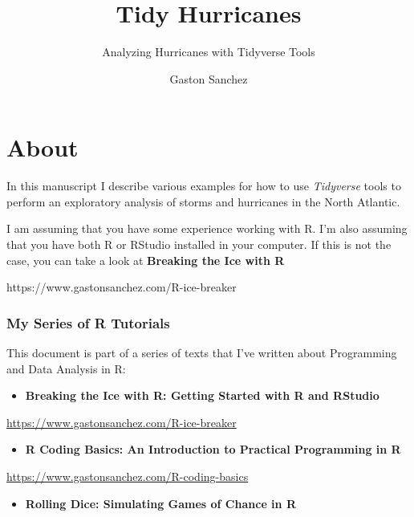 \documentclass[
]{book}
\title{Tidy Hurricanes}
\subtitle{Analyzing Hurricanes with Tidyverse Tools}
\author{Gaston Sanchez}
\date{}
\providecommand{\tightlist}{%
  \setlength{\itemsep}{0pt}\setlength{\parskip}{0pt}}
\begin{document}
\maketitle

{
\setcounter{tocdepth}{1}
\tableofcontents
}
\hypertarget{about}{%
\chapter*{About}\label{about}}

In this manuscript I describe various examples for how to use \emph{Tidyverse} tools
to perform an exploratory analysis of storms and hurricanes in the North Atlantic.

I am assuming that you have some experience working with R. I'm also assuming
that you have both R or RStudio installed in your computer. If this is not
the case, you can take a look at \textbf{Breaking the Ice with R}

https://www.gastonsanchez.com/R-ice-breaker

\hypertarget{my-series-of-r-tutorials}{%
\subsection*{My Series of R Tutorials}\label{my-series-of-r-tutorials}}

This document is part of a series of texts that I've written about Programming
and Data Analysis in R:

\begin{itemize}
\tightlist
\item
  \textbf{Breaking the Ice with R: Getting Started with R and RStudio}
\end{itemize}

\url{https://www.gastonsanchez.com/R-ice-breaker}

\begin{itemize}
\tightlist
\item
  \textbf{R Coding Basics: An Introduction to Practical Programming in R}
\end{itemize}

\url{https://www.gastonsanchez.com/R-coding-basics}

\begin{itemize}
\tightlist
\item
  \textbf{Rolling Dice: Simulating Games of Chance in R}
\end{itemize}
\end{document}
